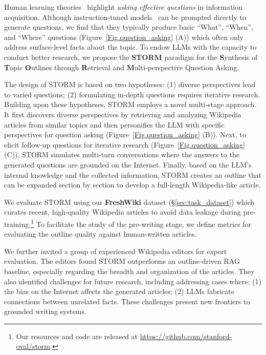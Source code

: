 \documentclass[11pt]{article}
\newcommand{\system}[0]{STORM\xspace}
\newcommand{\reffig}[1]{Figure~\ref{#1}}
\newcommand{\refsec}[1]{\S\ref{#1}} %
\begin{document}
Human learning theories~\citep{tawfik2020role,booth2003craft}  highlight \textit{asking effective questions} in information acquisition.  
Although instruction-tuned models~\citep{ouyang2022training} can be prompted directly to generate questions, we find that they typically produce basic ``What'', ``When'', and ``Where'' questions (\reffig{Fig.question_asking} (A)) which often only address surface-level facts about the topic. 
To endow LLMs with the capacity to conduct better research, we propose the \textbf{\system} paradigm for the \textbf{S}ynthesis of \textbf{T}opic \textbf{O}utlines through \textbf{R}etrieval and \textbf{M}ulti-perspective Question Asking.

The design of \system is based on two hypotheses: (1) diverse perspectives lead to varied questions; (2) formulating in-depth questions requires iterative research. Building upon these hypotheses, \system employs 
a novel multi-stage approach. It first discovers diverse perspectives by retrieving and analyzing Wikipedia articles from similar topics and then personifies the LLM with specific perspectives for question asking (\reffig{Fig.question_asking} (B)). Next, to elicit follow-up questions for iterative research (\reffig{Fig.question_asking} (C)), %
\system simulates multi-turn conversations where the answers to the generated questions are grounded on the Internet. Finally, based on the LLM's internal knowledge and the collected information, \system creates an outline that can be expanded section by section to develop a full-length Wikipedia-like article.











We evaluate \system using our \textbf{FreshWiki} dataset (\refsec{sec:task_dataset}) which curates recent, high-quality Wikipedia articles to avoid data leakage during pre-training.\footnote{Our resources and code are released at \url{https://github.com/stanford-oval/storm}.}
To facilitate the study of the pre-writing stage, we define metrics for evaluating the outline quality against human-written articles. 

We further invited a group of experienced Wikipedia editors for expert evaluation. %
The editors found STORM outperforms an outline-driven RAG baseline, especially regarding the breadth and organization of the articles. They also identified %
challenges for future research, including addressing cases where:
(1) the bias %
on the Internet affects the generated articles; (2) LLMs fabricate connections between unrelated facts. 
These challenges present new frontiers to grounded writing systems.
\end{document}
